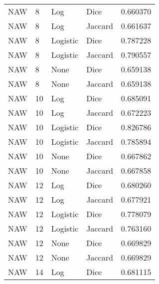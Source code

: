 \documentclass{article}
\begin{document}
\begin{center}
	\scriptsize
    
    \tablelasttail{\hline}

      \begin{supertabular}{| l | l | l | l | l |}
            NAW & 8 & Log & Dice & 0.660370 \\
            NAW & 8 & Log & Jaccard & 0.661637 \\
            NAW & 8 & Logistic & Dice & 0.787228 \\
            NAW & 8 & Logistic & Jaccard & 0.790557 \\
            NAW & 8 & None & Dice & 0.659138 \\
            NAW & 8 & None & Jaccard & 0.659138 \\
            NAW & 10 & Log & Dice & 0.685091 \\
            NAW & 10 & Log & Jaccard & 0.672223 \\
            NAW & 10 & Logistic & Dice & 0.826786 \\
            NAW & 10 & Logistic & Jaccard & 0.785894 \\
            NAW & 10 & None & Dice & 0.667862 \\
            NAW & 10 & None & Jaccard & 0.667858 \\
            NAW & 12 & Log & Dice & 0.680260 \\
            NAW & 12 & Log & Jaccard & 0.677921 \\
            NAW & 12 & Logistic & Dice & 0.778079 \\
            NAW & 12 & Logistic & Jaccard & 0.763160 \\
            NAW & 12 & None & Dice & 0.669829 \\
            NAW & 12 & None & Jaccard & 0.669829 \\
            NAW & 14 & Log & Dice & 0.681115 \\

\end{supertabular}
\end{center}
\end{document}

